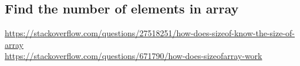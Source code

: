 \documentclass[a4paper]{article}
\begin{document}
\newpage
\subsection{Find the number of elements in array}

\url{https://stackoverflow.com/questions/27518251/how-does-sizeof-know-the-size-of-array}\\
\url{https://stackoverflow.com/questions/671790/how-does-sizeofarray-work}\\

\newpage
\printbibliography
\end{document}
